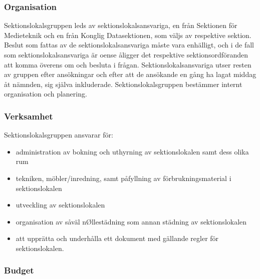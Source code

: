 \documentclass{dgovdoc}
\begin{document}
\subsubsection{Organisation}

Sektionslokalsgruppen leds av sektionslokalsansvariga, en från Sektionen för
Medieteknik och en från Konglig Datasektionen, som väljs av respektive sektion.
Beslut som fattas av de sektionslokalsansvariga måste vara enhälligt, och i de
fall som sektionslokalsansvariga är oense åligger det respektive
sektionsordföranden att komma överens om och besluta i frågan.
Sektionslokalsansvariga utser resten av gruppen efter ansökningar och efter att
de ansökande en gång ha lagat middag åt nämnden, sig själva inkluderade.
Sektionslokalsgruppen bestämmer internt organisation och planering.

\subsubsection{Verksamhet}

Sektionslokalsgruppen ansvarar för:

\begin{itemize}
  \item administration av bokning och uthyrning av sektionslokalen samt dess
    olika rum
\end{itemize}

\begin{itemize}
  \item tekniken, möbler/inredning, samt påfyllning av förbrukningsmaterial i
    sektionslokalen
\end{itemize}

\begin{itemize}
  \item utveckling av sektionslokalen
\end{itemize}

\begin{itemize}
  \item organisation av såväl nØllestädning som annan städning av
    sektionslokalen
\end{itemize}

\begin{itemize}
  \item att upprätta och underhålla ett dokument med gällande regler för
    sektionslokalen.
\end{itemize}

\subsubsection{Budget}
\end{document}
